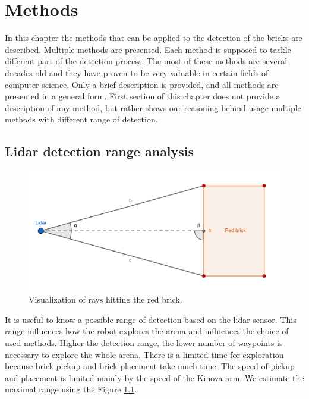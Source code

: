 \chapter{Methods}
\label{ch:methods}
In this chapter the methods that can be applied to the detection of the bricks are described. Multiple methods are presented. Each method is supposed to tackle different part of the detection process. The most of these methods are several decades old and they have proven to be very valuable in certain fields of computer science. Only a brief description is provided, and all methods are presented in a general form. First section of this chapter does not provide a description of any method, but rather shows our reasoning behind usage multiple methods with different range of detection.
 
\section{Lidar detection range analysis}

\begin{figure}[H]
	\centering
	\includegraphics[scale=1.25]{fig/lidar_range.png}
	\caption[Lidar range study]{Visualization of rays hitting the red brick.}
	\label{fig:range}
\end{figure}

It is useful to know a possible range of detection based on the lidar sensor. This range influences how the robot explores the arena and influences the choice of used methods. Higher the detection range, the lower number of waypoints is necessary to explore the whole arena. There is a limited time for exploration because brick pickup and brick placement take much time. The speed of pickup and placement is limited mainly by the speed of the Kinova arm. We estimate the maximal range using the Figure \ref{fig:range}.

